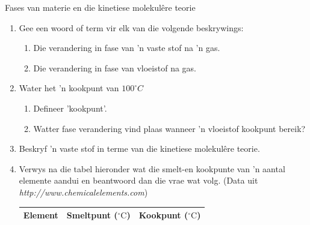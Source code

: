             \begin{eocexercises}{Fases van materie en die kinetiese molekul\^{e}re teorie}
            \nopagebreak \noindent
\label{m38730*id311490}\begin{enumerate}[noitemsep, label=\textbf{\arabic*}. ] 
            \label{m38730*uid87}\item Gee een woord of term vir elk van die volgende beskrywings:
\label{m38730*id311506}\begin{enumerate}[noitemsep, label=\textbf{\alph*}. ] 
            \label{m38730*uid88}\item Die verandering in fase van 'n vaste stof na 'n gas.
\label{m38730*uid89}\item Die verandering in fase van vloeistof na gas.
\end{enumerate}
                \label{m38730*uid103}\item Water het 'n kookpunt van $100 ^{\circ} C$
\label{m38730*id311744}\begin{enumerate}[noitemsep, label=\textbf{\alph*}. ] 
            \label{m38730*uid104}\item Defineer 'kookpunt'.
\label{m38730*uid105}\item Watter fase verandering vind plaas wanneer 'n vloeistof kookpunt bereik?
\end{enumerate}
\label{m38730*id762}\item Beskryf 'n vaste stof in terme van die kinetiese molekul\^{e}re teorie. \newline
            \label{m38730*uid108}\item Verwys na die tabel hieronder wat die smelt-en kookpunte van 'n aantal elemente aandui en beantwoord dan die vrae wat volg. (Data uit \textsl{http://www.chemicalelements.com})
          \begin{table}[H]
        \begin{center}
      \label{m38730*id311817}
      \begin{tabular}{|l|l|l|}\hline
\textbf{Element} & \textbf{Smeltpunt ($^{\circ} \text{C}$)} & \textbf{Kookpunt ($^{\circ} \text{C}$)} \\ \hline

\end{tabular}
\end{center}
\end{table}
\end{enumerate}
\end{eocexercises}
